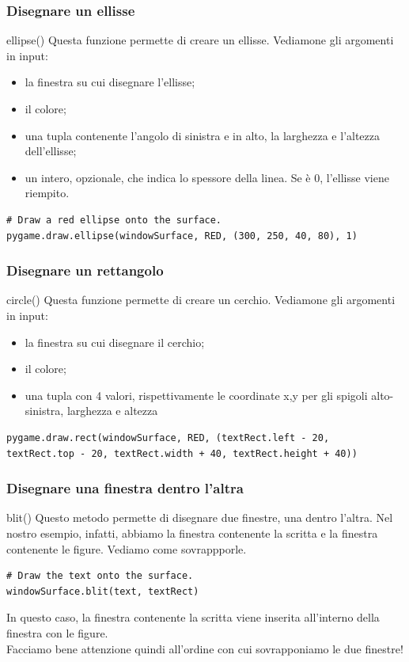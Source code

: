 \documentclass{beamer}
\begin{document}
\begin{frame}[fragile]
\frametitle{Disegnare un ellisse}
\begin{block}{ellipse()}
	Questa funzione permette di creare un ellisse. Vediamone gli argomenti in input:
	\begin{itemize}
		\item la finestra su cui disegnare l'ellisse;
		\item il colore;
		\item una tupla contenente l'angolo di sinistra e in alto, la larghezza e l'altezza dell'ellisse;
		\item un intero, opzionale, che indica lo spessore della linea. Se è 0, l'ellisse viene riempito.
	\end{itemize}
\end{block}
\begin{lstlisting}
# Draw a red ellipse onto the surface.
pygame.draw.ellipse(windowSurface, RED, (300, 250, 40, 80), 1)

\end{lstlisting}
\end{frame}

\begin{frame}[fragile]
\frametitle{Disegnare un rettangolo}
\begin{block}{circle()}
	Questa funzione permette di creare un cerchio. Vediamone gli argomenti in input:
	\begin{itemize}
		\item la finestra su cui disegnare il cerchio;
		\item il colore;
		\item una tupla con 4 valori, rispettivamente le coordinate x,y per gli spigoli alto-sinistra, larghezza e altezza 
	\end{itemize}
\end{block}
\begin{lstlisting}
pygame.draw.rect(windowSurface, RED, (textRect.left - 20,
textRect.top - 20, textRect.width + 40, textRect.height + 40))

\end{lstlisting}
\end{frame}

\begin{frame}[fragile]
\frametitle{Disegnare una finestra dentro l'altra}
\begin{block}{blit()}
	Questo metodo permette di disegnare due finestre, una dentro l'altra. Nel nostro esempio, infatti, abbiamo la finestra contenente la scritta e la finestra contenente le figure. Vediamo come sovrappporle.
\end{block}
\begin{lstlisting}
# Draw the text onto the surface.
windowSurface.blit(text, textRect)
\end{lstlisting}
In questo caso, la finestra contenente la scritta viene inserita all'interno della finestra con le figure.\\
Facciamo bene attenzione quindi all'ordine con cui sovrapponiamo le due finestre!
\end{frame}
\end{document}
